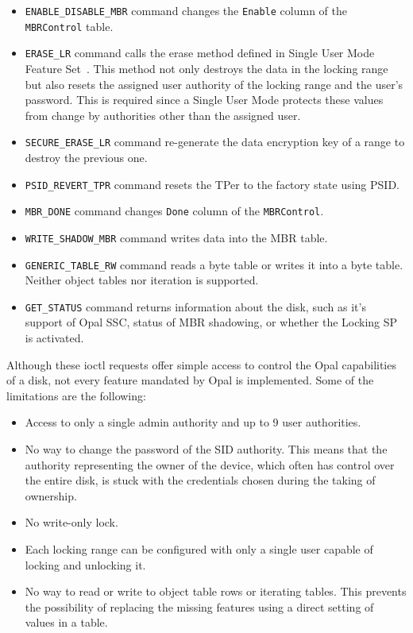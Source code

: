 \begin{itemize}
\item \verb|ENABLE_DISABLE_MBR| command changes the \verb|Enable| column of the \verb|MBRControl| table. %
\item \verb|ERASE_LR| command calls the erase method defined in Single User Mode Feature Set~\cite{tcg-sum}. This method not only destroys the data in the locking range but also resets the assigned user authority of the locking range and the user's password. This is required since a Single User Mode protects these values from change by authorities other than the assigned user.
\item \verb|SECURE_ERASE_LR| command re-generate the data encryption key of a range to destroy the previous one.
\item \verb|PSID_REVERT_TPR| command resets the TPer to the factory state using PSID.
\item \verb|MBR_DONE| command changes \verb|Done| column of the \verb|MBRControl|. %
\item \verb|WRITE_SHADOW_MBR| command writes data into the MBR table.
\item \verb|GENERIC_TABLE_RW| command reads a byte table or writes it into a byte table. Neither object tables nor iteration is supported.
\item \verb|GET_STATUS| command returns information about the disk, such as it's support of Opal SSC, status of MBR shadowing, or whether the Locking SP is activated.
\end{itemize}

Although these ioctl requests offer simple access to control the Opal capabilities of a disk, not every feature mandated by Opal is implemented. Some of the limitations are the following: 
\begin{itemize}
\item Access to only a single admin authority and up to 9 user authorities.
\item No way to change the password of the SID authority. This means that the authority representing the owner of the device, which often has control over the entire disk, is stuck with the credentials chosen during the taking of ownership. 
\item No write-only lock.
\item Each locking range can be configured with only a single user capable of locking and unlocking it.
\item No way to read or write to object table rows or iterating tables. This prevents the possibility of replacing the missing features using a direct setting of values in a table.
\end{itemize}

